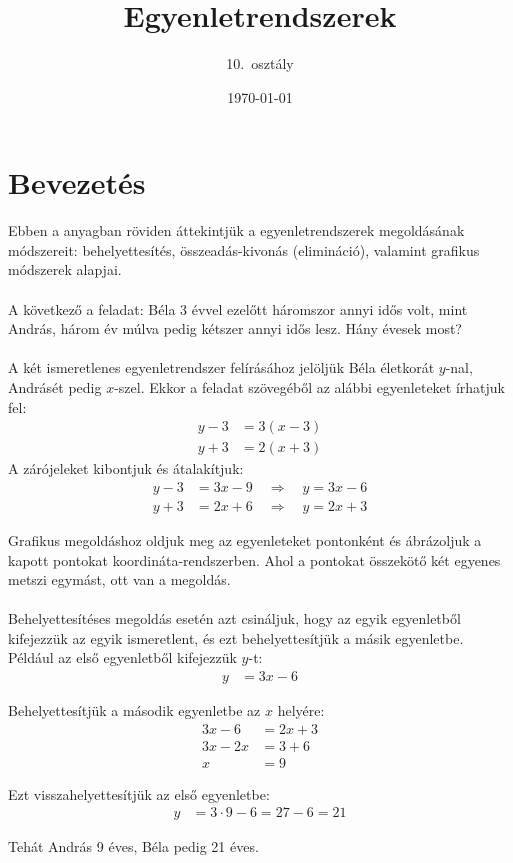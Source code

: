 \documentclass[12pt,a4paper]{article}
\title{Egyenletrendszerek}
\author{10.\ osztály}
\date{\today}
\begin{document}
\maketitle

\section*{Bevezetés}
\noindent Ebben a anyagban röviden áttekintjük a egyenletrendszerek megoldásának módszereit:
 behelyettesítés, összeadás-kivonás (elimináció), valamint grafikus módszerek alapjai.
\\\\
\noindent A következő a feladat:
Béla 3 évvel ezelőtt háromszor annyi idős volt, mint András, három év múlva pedig kétszer annyi idős lesz. Hány évesek most?
\\\\
\noindent A két ismeretlenes egyenletrendszer felírásához jelöljük Béla életkorát $y$-nal, Andrásét pedig $x$-szel. 
Ekkor a feladat szövegéből az alábbi egyenleteket írhatjuk fel:
\begin{align*}
	y-3 &= 3(x-3)\\
	y+3 &= 2(x+3)
\end{align*}
\noindent A zárójeleket kibontjuk és átalakítjuk:
\begin{align*}
	y - 3 &= 3x - 9 \quad \Rightarrow \quad y=3x-6\\ 
	y + 3 &= 2x + 6 \quad \Rightarrow \quad y=2x+3
\end{align*}

\noindent Grafikus megoldáshoz oldjuk meg az egyenleteket pontonként és ábrázoljuk a kapott pontokat koordináta-rendszerben. 
Ahol a pontokat összekötő két egyenes metszi egymást, ott van a megoldás.
\\\\
Behelyettesítéses megoldás esetén azt csináljuk, hogy az egyik egyenletből kifejezzük az egyik ismeretlent, és ezt behelyettesítjük a másik egyenletbe. 
Például az első egyenletből kifejezzük $y$-t:
\begin{align*}
	y &= 3x - 6 
\end{align*}

\noindent Behelyettesítjük a második egyenletbe az $x$ helyére:
\begin{align*}	
	3x - 6 &= 2x + 3 \\
	3x - 2x &= 3 + 6 \\
	x &= 9
\end{align*}

\noindent Ezt visszahelyettesítjük az első egyenletbe:
\begin{align*}
	y &= 3 \cdot 9 - 6 = 27 - 6 = 21
\end{align*}

\noindent Tehát András 9 éves, Béla pedig 21 éves.
\end{document}
